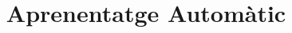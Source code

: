 \documentclass[a4paper]{report}
\title{Aprenentatge Automàtic}
\begin{document}
\maketitle

\tableofcontents
\pagebreak






\end{document}
